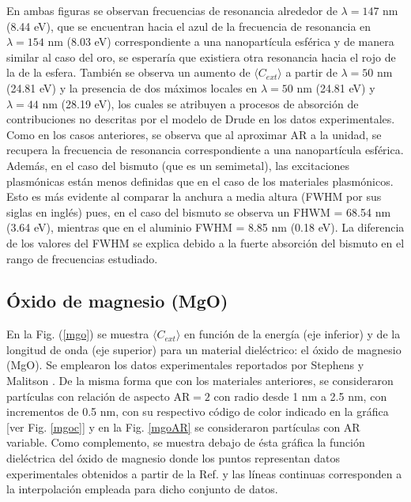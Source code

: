 En ambas figuras se observan frecuencias de resonancia alrededor de $\lambda=147$ nm (8.44 eV), que se encuentran hacia el azul de la frecuencia de resonancia en $\lambda=154$ nm (8.03 eV) correspondiente a una nanopartícula esférica y de manera similar al caso del oro, se esperaría que existiera otra resonancia hacia el rojo de la de la esfera. También se observa un aumento de $\langle C_{ext}\rangle$ a partir de $\lambda=50$ nm (24.81 eV) y la presencia de dos máximos locales en $\lambda=50$ nm (24.81 eV) y $\lambda=44$ nm (28.19 eV), los cuales se atribuyen a procesos de absorción de contribuciones no descritas por el modelo de Drude en los datos experimentales. Como en los casos anteriores, se observa que al aproximar AR a la unidad, se recupera la frecuencia de resonancia correspondiente a una nanopartícula esférica. Además, en el caso del bismuto (que es un semimetal), las excitaciones plasmónicas están menos definidas que en el caso de los materiales plasmónicos. Esto es más evidente al comparar la anchura a media altura (FWHM por sus siglas en inglés) pues, en el caso del bismuto se observa un FHWM = 68.54 nm (3.64 eV), mientras que en el aluminio FWHM = 8.85 nm (0.18 eV). La diferencia de los valores del FWHM se explica debido a la fuerte absorción del bismuto en el rango de frecuencias estudiado.





\subsection*{Óxido de magnesio (MgO)}
En la Fig. (\ref{mgo}) se muestra $\langle C_{ext}\rangle$ en función de la energía (eje inferior) y de la longitud de onda (eje superior) para un material dieléctrico: el óxido de magnesio (MgO). Se emplearon los datos experimentales reportados por Stephens y Malitson \cite{MgO}. De la misma forma que con los materiales anteriores, se consideraron partículas con relación de aspecto AR$=2$ con radio desde 1  nm a 2.5 nm, con incrementos de 0.5 nm, con su respectivo código de color indicado en la gráfica [ver Fig. \ref{mgoc}] y en la Fig. \ref{mgoAR} se consideraron partículas con AR variable.  Como complemento, se muestra debajo de ésta gráfica  la función dieléctrica del óxido de magnesio donde los puntos representan datos experimentales obtenidos a partir de la Ref. \cite{MgO} y las líneas continuas corresponden a la interpolación empleada para dicho conjunto de datos.

